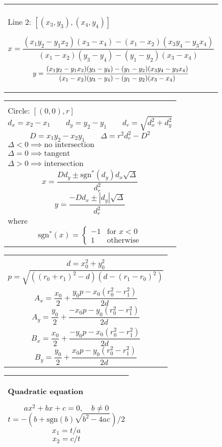 \documentclass[10pt,a4paper,twocolumn]{article}
\newenvironment{fpar}
	{
		\nopagebreak
		\begin{tabular}{|l|}
		\hline\begin{minipage}{277pt}
		\vspace{0.5em}
	}
	{
		\vspace{0.5em}
		\end{minipage}\\
		\hline\end{tabular}
		\nopagebreak
	}
\begin{document}
\begin{fpar}
{\bf Line-line intersection}

Line 1: $[(x_1,y_1), (x_2,y_2)]$\\
Line 2: $[(x_3,y_3), (x_4,y_4)]$

$$x = \frac{(x_1 y_2-y_1 x_2)(x_3-x_4)-(x_1-x_2)(x_3 y_4-y_3
x_4)}{(x_1-x_2)(y_3-y_4)-(y_1-y_2)(x_3-x_4)}
$$
$$y = \\ \frac{(x_1 y_2-y_1
x_2)(y_3-y_4)-(y_1-y_2)(x_3 y_4-y_3
x_4)}{(x_1-x_2)(y_3-y_4)-(y_1-y_2)(x_3-x_4)}
$$
\end{fpar}

\begin{fpar}
{\bf Line-circle intersection}

Line: $[(x_1,y_1), (x_2,y_2)]$\\
Circle: $[(0,0), r]$
$$d_x = x_2 - x_1\qquad d_y=y_2-y_1\qquad
d_r=\sqrt{d_x^2 + d_y^2}$$
$$D=x_1y_2 - x_2y_1\qquad
\Delta = r^2 d_r^2 - D^2$$
$\Delta < 0 \implies \text{no intersection}$\\
$\Delta = 0 \implies \text{tangent}$\\
$\Delta > 0 \implies \text{intersection}$\\
$$x = \frac{Dd_y \pm \text{sgn}^*(d_y)d_x\sqrt\Delta }{d_r^2}$$
$$y = \frac{-Dd_x \pm |d_y|\sqrt\Delta }{d_r^2}$$
where
$$\text{sgn}^*(x) =
\left\{\begin{array}{ll}
-1 & \text{for } x < 0 \\
1 & \text{otherwise}
\end{array}
\right.
$$
\end{fpar}

\begin{fpar}
{\bf Circle-circle intersection}

$$(x-x_0)^2 + (y-y_0)^2 = r_0^2$$
$$x^2 + y^2 = r_1^2$$
\\
$$d = x_0^2 + y_0^2$$
$$p=\sqrt{\left((r_0+r_1)^2 - d\right)
          \left(d-(r_1-r_0)^2\right)}$$
\\
$$A_x = \frac{x_0}2 + \frac{y_0p - x_0\left(r_0^2-r_1^2\right)}{2d}$$
$$A_y = \frac{y_0}2 + \frac{-x_0p - y_0\left(r_0^2-r_1^2\right)}{2d}$$
\\
$$B_x = \frac{x_0}2 + \frac{-y_0p - x_0\left(r_0^2-r_1^2\right)}{2d}$$
$$B_y = \frac{y_0}2 + \frac{x_0p - y_0\left(r_0^2-r_1^2\right)}{2d}$$
\end{fpar}

\begin{fpar}
{\bf Quadratic equation}

$$ax^2 + bx + c = 0, \quad b \neq 0$$
$$t = -\left(b + \text{sgn}(b) \sqrt{b^2-4ac}\right) / 2$$
$$x_1 = t / a$$
$$x_2 = c / t$$
\end{fpar}
\end{document}
